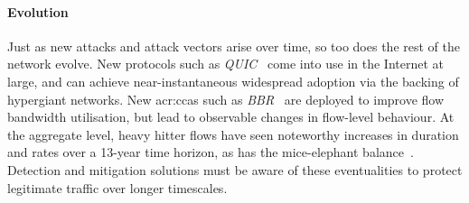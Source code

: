 \paragraph{Evolution}
Just as new attacks and attack vectors arise over time, so too does the rest of the network evolve.
New protocols such as \emph{QUIC}~\parencite{DBLP:conf/sigcomm/LangleyRWVKZYKS17} come into use in the Internet at large, and can achieve near-instantaneous widespread adoption via the backing of hypergiant networks.
New \glspl{acr:cca} such as \emph{BBR}~\parencite{DBLP:journals/queue/CardwellCGYJ16} are deployed to improve flow bandwidth utilisation, but lead to observable changes in flow-level behaviour.
At the aggregate level, heavy hitter flows have seen noteworthy increases in duration and rates over a 13-year time horizon, as has the mice-elephant balance~\parencite{DBLP:conf/anrw/BauerJHBC21}.
Detection and mitigation solutions must be aware of these eventualities to protect legitimate traffic over longer timescales.

%


%



